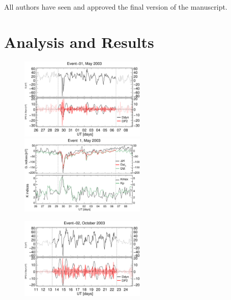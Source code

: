 \documentclass[a4paper,fleqn]{cas-dc}
\begin{document}
All authors have seen and approved the final version of the manuscript.  


\label{Ack}
%




\bio{}
\endbio

\appendix 
\section{Analysis and Results}
\label{apend}
\begin{figure}[h!]
    \centering
    \centerline{\Large \bf   
         \hfill}
          \centerline{\Large \bf   
      \hspace{0.26\textwidth}  \color{black}{}
       \hspace{0.31\textwidth}  \color{black}{}
         \hfill}
     \includegraphics[width=6.0cm]{images/diono/iono_PI_V1_2003-05-26.eps}
	\includegraphics[width=6.0cm]{images/dH_approx/diono_valid_V4_2003-05-26.eps}
     \centerline{\Large \bf   
      \hspace{0.275\textwidth}  \color{black}{}
       \hspace{0.295\textwidth}  \color{black}{}
         \hfill}
     \includegraphics[width=6.0cm]{images/diono/iono_PI_V1_2003-10-11.eps}

\end{figure}
\end{document}
